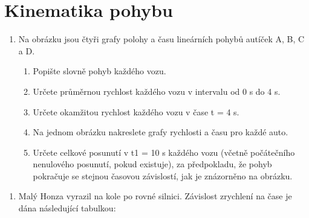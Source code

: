 \documentclass[letterpaper,10pt,english]{jupyterBook}
\begin{document}
{{\begin{enumerate}
\end{enumerate}

\sphinxAtStartPar
{}

\sphinxAtStartPar
{}


\section{Kinematika pohybu}
\label{\detokenize{Cviceni/C1:kinematika-pohybu}}\begin{enumerate}
%
\item {} 
\sphinxAtStartPar
Na obrázku jsou čtyři grafy polohy a času lineárních pohybů autíček A, B, C a D.
\begin{enumerate}
%
\item {} 
\sphinxAtStartPar
Popište slovně pohyb každého vozu.

\item {} 
\sphinxAtStartPar
Určete průměrnou rychlost každého vozu v intervalu od 0 s do 4 s.

\item {} 
\sphinxAtStartPar
Určete okamžitou rychlost každého vozu v čase t = 4 s.

\item {} 
\sphinxAtStartPar
Na jednom obrázku nakreslete grafy rychlosti a času pro každé auto.

\item {} 
\sphinxAtStartPar
Určete celkové posunutí v t1 = 10 s každého vozu (včetně počátečního nenulového posunutí, pokud existuje), za předpokladu, že pohyb pokračuje se stejnou časovou závislostí, jak je znázorněno na obrázku.

\end{enumerate}

\end{enumerate}

\sphinxAtStartPar


\sphinxAtStartPar
{}
\begin{enumerate}
%
\setcounter{enumi}{1}
\item {} 
\sphinxAtStartPar
Malý Honza vyrazil na kole po rovné silnici. Závislost zrychlení na čase je dána následující tabulkou:


\end{enumerate}}}
\end{document}

